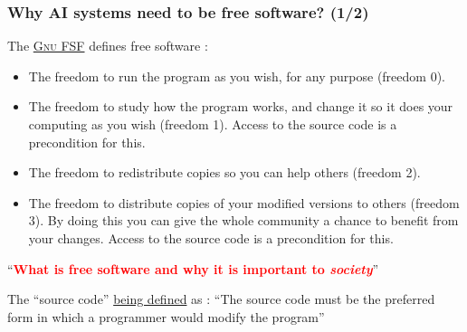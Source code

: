 \documentclass[xcolor=svgnames,final,smaller,a4]{beamer}
\begin{document}
 \begin{frame}
   \frametitle{Why AI systems need to be free software? (1/2)}

   The \href{https://www.gnu.org/philosophy/free-sw.en.htm}{\textsc{Gnu FSF}} defines free software :
   \begin{itemize}

    \item The freedom to run the program as you wish, for any purpose (freedom 0).
    \item The freedom to study how the program works, and change it so it does your computing as you wish (freedom 1). Access to the source code is a precondition for this.
    \item The freedom to redistribute copies so you can help others (freedom 2).
    \item The freedom to distribute copies of your modified versions to others (freedom 3). By doing this you can give the whole community a chance to benefit from your changes. Access to the source code is a precondition for this.

   \end{itemize}

   ``\textcolor{red}{\textbf{What is free software and why it is important to \emph{society}}}''

   \medskip
   
 The ``source code''
 \href{https://en.wikisource.org/wiki/The_Open_Source_Definition}{being
   defined} as : ``The source code must be the preferred form in which
 a programmer would modify the program''
 \end{frame}
\end{document}
